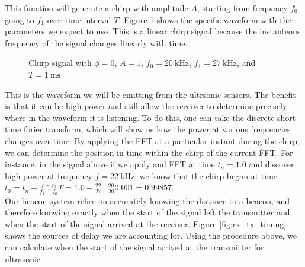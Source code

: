 \documentclass{article}
\begin{document}
This function will generate a chirp with amplitude $A$, starting from frequency $f_0$ going to $f_1$ over time interval $T$. Figure \ref{fig:chirp} shows the specific waveform with the parameters we expect to use. This is a linear chirp signal because the instanteous frequency of the signal changes linearly with time.

\begin{figure}[H]
  \centering
  \label{fig:chirp}
  \caption{Chirp signal with $\phi=0$, $A=1$, $f_0=\SI{20}{\kilo\hertz}$, $f_1=\SI{27}{\kilo\hertz}$, and $T=\SI{1}{\milli\second}$}
\end{figure}

This is the waveform we will be emitting from the ultrsonic sensors. The benefit is that it can be high power and still allow the receiver to determine precisely where in the waveform it is listening. To do this, one can take the discrete short time forier transform, which will show us how the power at various frequencies changes over time. By applying the FFT at a particular instant during the chirp, we can determine the position in time within the chirp of the current FFT. For instance, in the signal above if we apply and FFT at time $t_n=1.0$ and discover high power at frequency $f=\SI{22}{\kilo\hertz}$, we know that the chirp began at time $t_0 = t_n - \tfrac{f - f_0}{f_1 - f_0}T = 1.0 - \tfrac{22-20}{27-20}0.001 = 0.99857$. \\

Our beacon system relies on accurately knowing the distance to a beacon, and therefore knowing exactly when the start of the signal left the transmitter and when the start of the signal arrived at the receiver. Figure \ref{fig:rx_tx_timing} shows the sources of delay we are accounting for. Using the procedure above, we can calculate when the start of the signal arrived at the transmitter for ultrasonic.
\end{document}
